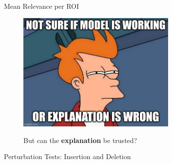 \documentclass[aspectratio=169,xcolor={table, dvipsnames}]{beamer}
\renewcommand{\emph}[1]{\textbf{#1}}
\begin{document}
\begin{frame}{Mean Relevance per ROI}
	
\end{frame}
\begin{frame}[plain]
	\begin{center}
		\begin{figure}
			\href{https://knowyourmeme.com/memes/futurama-fry-not-sure-if}{
				\includegraphics[width=0.7\textwidth]{figures/fry-and-xai-2.png
				}}
			\caption*{But can the \emph{explanation} be trusted?}
		\end{figure}

	\end{center}
\end{frame}


\begin{frame}{Perturbation Tests: Insertion and Deletion}
	\begin{figure}
		\resizebox{0.5\textwidth}{!}{
			
		}
	\end{figure}
\end{frame}
\end{document}
